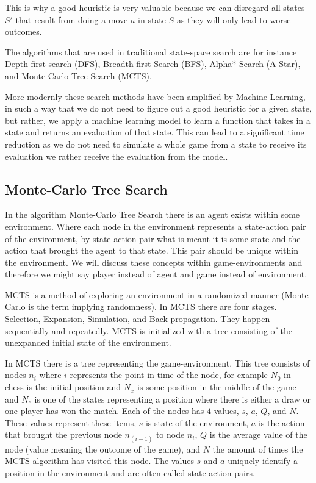 This is why a good heuristic is very valuable because we can disregard all states $S'$ that 
result from doing a move $a$ in state $S$ as they will only lead to worse outcomes.

The algorithms that are used in traditional state-space search are for instance Depth-first search (DFS),
Breadth-first Search (BFS), Alpha* Search (A-Star), and Monte-Carlo Tree Search (MCTS).

More modernly these search methods have been amplified by Machine Learning, in such a way that 
we do not need to figure out a good heuristic for a given state, but rather, we apply a machine 
learning model to learn a function that takes in a state and returns an evaluation of that state.
This can lead to a significant time reduction as we do not need to simulate a whole game from a 
state to receive its evaluation we rather receive the evaluation from the model.

\subsection{Monte-Carlo Tree Search}

\label{sec:mcts}

In the algorithm Monte-Carlo Tree Search there is an agent exists
within some environment. Where each node in the environment represents a state-action pair of the environment, by
state-action pair what is meant it is some state and the action that brought the agent to
that state. This pair should be unique within the environment. We will discuss these concepts within game-environments
and therefore we might say player instead of agent and game instead of environment.

MCTS is a method of exploring an environment in a randomized manner (Monte Carlo is the term implying
randomness). In MCTS there are four stages. Selection, Expansion, Simulation, and Back-propagation. They happen sequentially
and repeatedly. MCTS is initialized with a tree consisting of the unexpanded initial state of the environment.

In MCTS there is a tree representing the game-environment. This tree consists of nodes $n_i$ where $i$ represents the point in time
of the node, for example $N_0$ in chess is the initial position and $N_x$ is some position in the middle of the game and $N_e$ is one of
the states representing a position where there is either a draw or one player has won the match. Each of the nodes has $4$ values,
$s$, $a$, $Q$, and $N$. These values represent these items, $s$ is state of the environment, $a$ is the action that brought
the previous node $n_(i-1)$ to node $n_i$, $Q$ is the average value of the node (value meaning the outcome of the game),
and $N$ the amount of times the MCTS algorithm has visited this node. The values $s$ and $a$ uniquely identify a position
in the environment and are often called state-action pairs.

